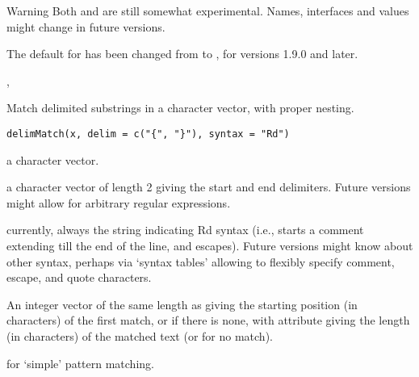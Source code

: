 %
\begin{Section}{Warning}
Both  and  are still somewhat
experimental.  Names, interfaces and values might change in future
versions.
\end{Section}
%
\begin{Note}\relax
The default for  has been changed from
 to , for \R{} versions 1.9.0 and later.
\end{Note}
%
\begin{SeeAlso}\relax
{}, 
\end{SeeAlso}
%
\begin{Description}\relax
Match delimited substrings in a character vector, with proper nesting.
\end{Description}
%
\begin{Usage}
\begin{verbatim}
delimMatch(x, delim = c("{", "}"), syntax = "Rd")
\end{verbatim}
\end{Usage}
%
\begin{Arguments}
\begin{ldescription}
\item[\code{x}] a character vector.
\item[\code{delim}] a character vector of length 2 giving the start and end
delimiters.  Future versions might allow for arbitrary regular
expressions.
\item[\code{syntax}] currently, always the string  indicating Rd
syntax (i.e., \samp{\%} starts a comment extending till the end of
the line, and \samp{\bsl{}} escapes).  Future versions might know about
other syntax, perhaps via `syntax tables' allowing to
flexibly specify comment, escape, and quote characters.
\end{ldescription}
\end{Arguments}
%
\begin{Value}
An integer vector of the same length as  giving the starting
position (in characters) of the first match, or  if there is
none, with attribute  giving the length (in
characters) of the matched text (or  for no match).
\end{Value}
%
\begin{SeeAlso}\relax
{} for `simple' pattern matching.
\end{SeeAlso}
